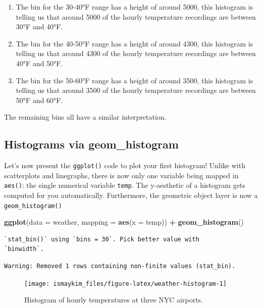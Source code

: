 \documentclass[12pt, krantz2,]{krantz}
\makeatletter
\newenvironment{Shaded}{\begin{snugshade}}{\end{snugshade}}
\newcommand{\DataTypeTok}[1]{\textcolor[rgb]{0.27,0.27,0.27}{#1}}
\newcommand{\KeywordTok}[1]{\textcolor[rgb]{0.27,0.27,0.27}{\textbf{#1}}}
\newcommand{\NormalTok}[1]{#1}
\newcommand{\OperatorTok}[1]{\textcolor[rgb]{0.43,0.43,0.43}{\textbf{#1}}}
\newcommand{\StringTok}[1]{\textcolor[rgb]{0.5,0.5,0.5}{#1}}
\providecommand{\tightlist}{%
  \setlength{\itemsep}{0pt}\setlength{\parskip}{0pt}}
\newenvironment{kframe}{%
\medskip{}
\setlength{\fboxsep}{.8em}
 \def\at@end@of@kframe{}%
 \ifinner\ifhmode%
  \def\at@end@of@kframe{\end{minipage}}%
  \begin{minipage}{\columnwidth}%
 \fi\fi%
 \def\FrameCommand##1{\hskip\@totalleftmargin \hskip-\fboxsep
 \colorbox{shadecolor}{##1}\hskip-\fboxsep
     \hskip-\linewidth \hskip-\@totalleftmargin \hskip\columnwidth}%
 \MakeFramed {\advance\hsize-\width
   \@totalleftmargin\z@ \linewidth\hsize
   \@setminipage}}%
 {\par\unskip\endMakeFramed%
 \at@end@of@kframe}
\renewenvironment{Shaded}{\begin{kframe}}{\end{kframe}}
\makeatother
\begin{document}
\begin{enumerate}
\def\labelenumi{\arabic{enumi}.}
\tightlist
\item
  The bin for the 30-40°F range has a height of around 5000, this histogram is telling us that around 5000 of the hourly temperature recordings are between 30°F and 40°F.
\item
  The bin for the 40-50°F range has a height of around 4300, this histogram is telling us that around 4300 of the hourly temperature recordings are between 40°F and 50°F.
\item
  The bin for the 50-60°F range has a height of around 3500, this histogram is telling us that around 3500 of the hourly temperature recordings are between 50°F and 60°F.
\end{enumerate}

The remaining bins all have a similar interpretation.

\hypertarget{geomhistogram}{%
\subsection{Histograms via geom\_histogram}\label{geomhistogram}}

Let's now present the \texttt{ggplot()} code to plot your first histogram! Unlike with scatterplots and linegraphs, there is now only one variable being mapped in \texttt{aes()}: the single numerical variable \texttt{temp}. The y-aesthetic of a histogram gets computed for you automatically. Furthermore, the geometric object layer is now a \texttt{geom\_histogram()}

\begin{Shaded}
\begin{Highlighting}[]
\KeywordTok{ggplot}\NormalTok{(}\DataTypeTok{data =}\NormalTok{ weather, }\DataTypeTok{mapping =} \KeywordTok{aes}\NormalTok{(}\DataTypeTok{x =}\NormalTok{ temp)) }\OperatorTok{+}
\StringTok{  }\KeywordTok{geom_histogram}\NormalTok{()}
\end{Highlighting}
\end{Shaded}

\begin{verbatim}
`stat_bin()` using `bins = 30`. Pick better value with
`binwidth`.
\end{verbatim}

\begin{verbatim}
Warning: Removed 1 rows containing non-finite values (stat_bin).
\end{verbatim}

\begin{figure}

{\centering \texttt{[image: ismaykim\_files/figure-latex/weather-histogram-1]} 

}

\caption{Histogram of hourly temperatures at three NYC airports.}\label{fig:weather-histogram}
\end{figure}
\end{document}

